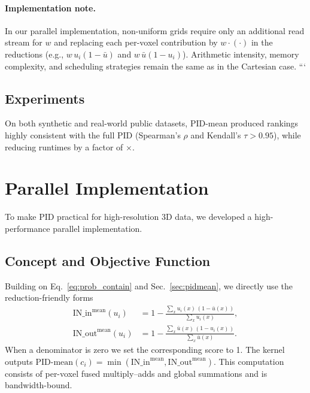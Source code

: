 \documentclass[review,journal]{vgtc}              %
\begin{document}
\paragraph{Implementation note.}
In our parallel implementation, non-uniform grids require only an additional read stream for $w$ and replacing each per-voxel contribution by $w\!\cdot(\cdot)$ in the reductions (e.g., $w\,u_i(1-\bar u)$ and $w\,\bar u(1-u_i)$). Arithmetic intensity, memory complexity, and scheduling strategies remain the same as in the Cartesian case.
```

\subsection{Experiments}
On both synthetic and real-world public datasets, PID-mean produced rankings highly consistent with the full PID (Spearman's $\rho$ and Kendall's $\tau > 0.95$), while reducing runtimes by a factor of $\times$.

\section{Parallel Implementation}
To make PID practical for high-resolution 3D data, we developed a high-performance parallel implementation.

\subsection{Concept and Objective Function}
Building on Eq.~\eqref{eq:prob_contain} and Sec.~\ref{sec:pidmean}, we directly use the reduction-friendly forms
\begin{align}
 \mathrm{IN\_in}^{\text{mean}}(u_i) &= 1 - \frac{\sum_x u_i(x)\,(1-\bar u(x))}{\sum_x u_i(x)}, \\
 \mathrm{IN\_out}^{\text{mean}}(u_i) &= 1 - \frac{\sum_x \bar u(x)\,(1-u_i(x))}{\sum_x \bar u(x)}.
\end{align}
When a denominator is zero we set the corresponding score to 1. The kernel outputs
\(\mathrm{PID\text{-}mean}(c_i)=\min(\mathrm{IN\_in}^{\text{mean}},\mathrm{IN\_out}^{\text{mean}})\).
This computation consists of per-voxel fused multiply–adds and global summations and is bandwidth-bound.
\end{document}
